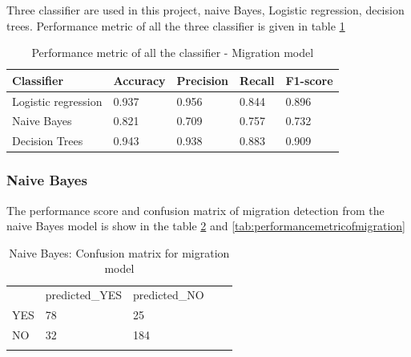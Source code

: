 Three classifier are used in this project, naive Bayes, Logistic regression, decision trees. Performance metric of all the three classifier is given in table \ref{tab:Migration_metric}


\begin{table}[]
\centering
\begin{tabular}{lllll}
\hline
\textbf{Classifier} & \textbf{Accuracy} & \textbf{Precision} & \textbf{Recall} & \textbf{F1-score} \\ \hline
Logistic regression & 0.937             & 0.956              & 0.844           & 0.896             \\ \hline
Naive Bayes         & 0.821             & 0.709              & 0.757           & 0.732             \\ \hline
Decision Trees     & 0.943             & 0.938              & 0.883           & 0.909             \\ \hline
\end{tabular}
\caption{Performance metric of all the classifier - Migration model}
\label{tab:Migration_metric}
\end{table}

\subsubsection{Naive Bayes}
The performance score and confusion matrix of migration detection from the naive Bayes model is show in the table \ref{tab:confusionmatrix_migrationtweets} and \ref{tab:performancemetricofmigration}

\begin{table}[]
\centering
\begin{tabular}{lllll}
\cline{1-3}
\multicolumn{1}{|l|}{}   & \multicolumn{1}{l|}{predicted\_YES} & \multicolumn{1}{l|}{predicted\_NO}  &  &  \\ \cline{1-3}
\multicolumn{1}{|l|}{YES} & \multicolumn{1}{l|}{78}  & \multicolumn{1}{l|}{25} &  &  \\ \cline{1-3}
\multicolumn{1}{|l|}{NO}   & \multicolumn{1}{l|}{32}  & \multicolumn{1}{l|}{184}  &  &  \\ \cline{1-3}
                            &                           &                           &  & 
\end{tabular}
\caption{Naive Bayes: Confusion matrix for migration model}
\label{tab:confusionmatrix_migrationtweets}
\end{table}





